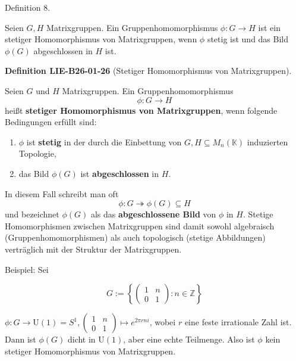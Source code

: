 \documentclass[10pt, letterpaper]{article}
\newcommand{\CustomHeading}[3]{%
  \par\medskip\noindent%
  \textbf{#1 #2} \textnormal{(#3)}.\enskip%
}
\newenvironment{DEF}[2]{\begin{unitbox}\CustomHeading{Definition}{#1}{#2}}{\end{unitbox}}
\begin{document}
Definition 8. 


Seien $G, H$ Matrixgruppen. Ein Gruppenhomomorphismus $\phi: G \rightarrow H$ ist ein stetiger Homomorphismus von Matrixgruppen, wenn $\phi$ stetig ist und das Bild $\phi(G)$ abgeschlossen in $H$ ist.


\begin{DEF}{LIE-B26-01-26}{Stetiger Homomorphismus von Matrixgruppen}
Seien $G$ und $H$ Matrixgruppen.  
Ein Gruppenhomomorphismus
\[
\phi : G \longrightarrow H
\]
heißt \textbf{stetiger Homomorphismus von Matrixgruppen}, wenn folgende Bedingungen erfüllt sind:
\begin{enumerate}
  \item $\phi$ ist \textbf{stetig} in der durch die Einbettung von $G, H \subseteq M_n(\mathbb{K})$ induzierten Topologie,
  \item das Bild $\phi(G)$ ist \textbf{abgeschlossen} in $H$.
\end{enumerate}
In diesem Fall schreibt man oft
\[
\phi : G \twoheadrightarrow \phi(G) \subseteq H
\]
und bezeichnet $\phi(G)$ als das \textbf{abgeschlossene Bild} von $\phi$ in $H$.  
Stetige Homomorphismen zwischen Matrixgruppen sind damit sowohl algebraisch (Gruppenhomomorphismen) als auch topologisch (stetige Abbildungen) verträglich mit der Struktur der Matrixgruppen.
\end{DEF}




Beispiel: Sei

$$
G:=\left\{\left(\begin{array}{cc}
1 & n \\
0 & 1
\end{array}\right): n \in \mathbb{Z}\right\}
$$

$\phi: G \rightarrow \mathrm{U}(1)=S^{1},\left(\begin{array}{cc}1 & n \\ 0 & 1\end{array}\right) \mapsto e^{2 \pi r n i}$, wobei $r$ eine feste irrationale Zahl ist. Dann ist $\phi(G)$ dicht in $\mathrm{U}(1)$, aber eine echte Teilmenge. Also ist $\phi$ kein stetiger Homomorphismus von Matrixgruppen.
\end{document}

